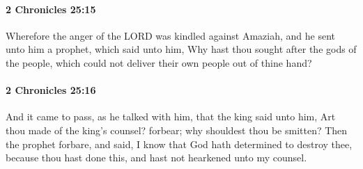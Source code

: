 		\paragraph{2 Chronicles 25:15} %
			\label{2CHRONICLES-25-15}

			Wherefore the anger of the LORD was kindled against Amaziah, and he sent unto him a prophet, which said unto him, Why hast thou sought after the gods of the people, which could not deliver their own people out of thine hand?


		\paragraph{2 Chronicles 25:16} %
			\label{2CHRONICLES-25-16}

			And it came to pass, as he talked with him, that the king said unto him, Art thou made of the king's counsel? forbear; why shouldest thou be smitten? Then the prophet forbare, and said, I know that God hath determined to destroy thee, because thou hast done this, and hast not hearkened unto my counsel.

